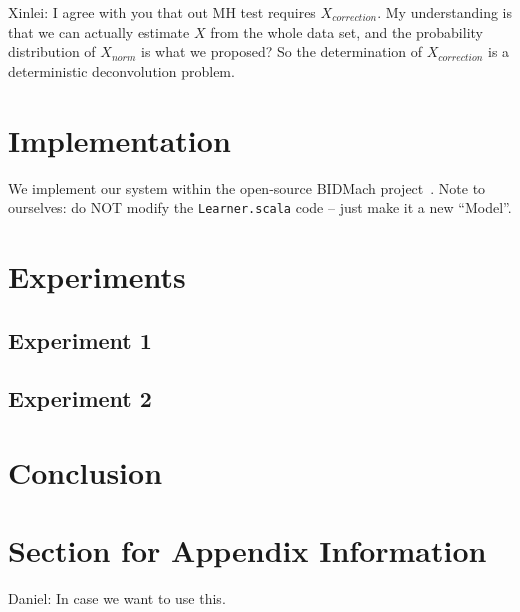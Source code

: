 \documentclass{article}
\begin{document}
{\color{blue} Xinlei: I agree with you that out MH test requires $X_{correction}$. My understanding
is that we can actually estimate $X$ from the whole data set, and the probability distribution of
$X_{norm}$ is what we proposed? So the determination of $X_{correction}$ is a deterministic
deconvolution problem.  }




\section{Implementation}\label{sec:implementation}

We implement our system within the open-source BIDMach project~\cite{canny2013bidmach}. Note to
ourselves: do NOT modify the \texttt{Learner.scala} code -- just make it a new ``Model''.




\section{Experiments}\label{sec:experiments}

\subsection{Experiment 1}

\subsection{Experiment 2}




\section{Conclusion}\label{sec:conclusion}


\small



\clearpage
\appendix

\section{Section for Appendix Information}

{\color{blue}
Daniel: In case we want to use this.
}



\end{document}

